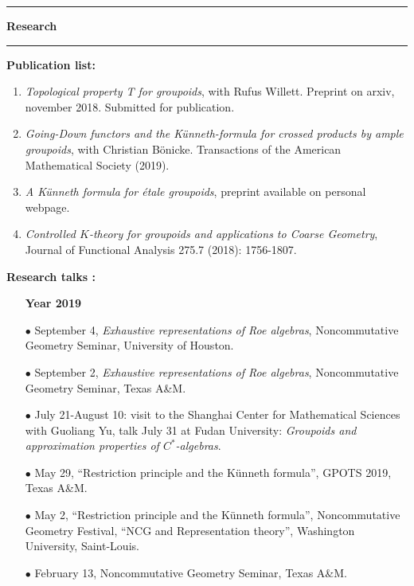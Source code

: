 \documentclass[a4paper,11pt]{article}
\newcommand\espace{\vrule height 20pt width 0pt}
\newcommand{\titre}[1]{%
	\begin{center}
	\bigskip
	\rule{\textwidth}{1pt}
	\par\vspace{0.1cm}
        \textbf{\large #1}
	\par\rule{\textwidth}{1pt}
	\end{center}
	\bigskip
	}
\begin{document}
\newpage
\titre{Research}

\textbf{Publication list:} 
\begin{enumerate}
\item \textit{Topological property T for groupoids}, with Rufus Willett. Preprint on arxiv, november 2018. Submitted for publication.
\item \textit{Going-Down functors and the Künneth-formula for crossed products by ample groupoids}, with Christian Bönicke. Transactions of the American Mathematical Society (2019).
\item \textit{A K\"{u}nneth formula for \'etale groupoids}, preprint available on personal webpage.
\item \textit{Controlled $K$-theory for groupoids and applications to Coarse Geometry}, Journal of Functional Analysis 275.7 (2018): 1756-1807.
\end{enumerate}
\espace


\textbf{Research talks :}\\

\begin{itemize}
\item[\textbf{Year 2019}]
\item[$\bullet$] September 4, \textit{Exhaustive representations of Roe algebras}, Noncommutative Geometry Seminar, University of Houston.
\item[$\bullet$] September 2, \textit{Exhaustive representations of Roe algebras}, Noncommutative Geometry Seminar, Texas A\&M. 
\item[$\bullet$] July 21-August 10: visit to the Shanghai Center for Mathematical Sciences with Guoliang Yu, talk July 31 at Fudan University: \textit{Groupoids and approximation properties of $C^*$-algebras}. 
\item[$\bullet$] May 29, ``Restriction principle and the Künneth formula'', GPOTS 2019, Texas A\&M.
\item[$\bullet$] May 2, ``Restriction principle and the Künneth formula'', Noncommutative Geometry Festival, ``NCG and Representation theory'', Washington University, Saint-Louis.
\item[$\bullet$] February 13, Noncommutative Geometry Seminar, Texas A\&M.
\end{itemize}
\end{document}
